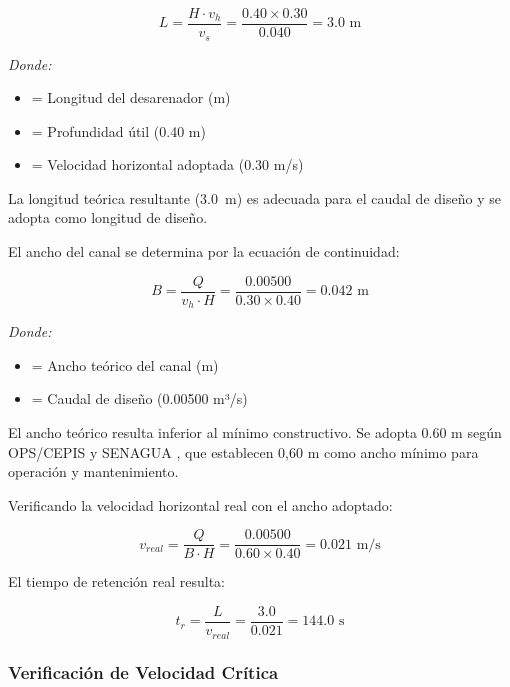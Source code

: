 \documentclass[12pt,a4paper]{article}
\begin{document}
\begin{equation}
L = \frac{H \cdot v_h}{v_s} = \frac{0.40 \times 0.30}{0.040} = 3.0 \text{ m}
\end{equation}

\textit{Donde:}
\begin{itemize}[noitemsep,leftmargin=2em]
    \item[$L$] = Longitud del desarenador (m)
    \item[$H$] = Profundidad útil (0.40 m)
    \item[$v_h$] = Velocidad horizontal adoptada (0.30 m/s)
\end{itemize}

La longitud teórica resultante (3.0~m) es adecuada para el caudal de diseño y se adopta como longitud de diseño.

El ancho del canal se determina por la ecuación de continuidad:

\begin{equation}
B = \frac{Q}{v_h \cdot H} = \frac{0.00500}{0.30 \times 0.40} = 0.042 \text{ m}
\end{equation}

\textit{Donde:}
\begin{itemize}[noitemsep,leftmargin=2em]
    \item[$B$] = Ancho teórico del canal (m)
    \item[$Q$] = Caudal de diseño (0.00500 m³/s)
\end{itemize}

El ancho teórico resulta inferior al mínimo constructivo. Se adopta 0.60 m según OPS/CEPIS \cite{ops2005} y SENAGUA \cite{senagua2012}, que establecen 0,60 m como ancho mínimo para operación y mantenimiento.

Verificando la velocidad horizontal real con el ancho adoptado:

\begin{equation}
v_{real} = \frac{Q}{B \cdot H} = \frac{0.00500}{0.60 \times 0.40} = 0.021 \text{ m/s}
\end{equation}

El tiempo de retención real resulta:

\begin{equation}
t_r = \frac{L}{v_{real}} = \frac{3.0}{0.021} = 144.0 \text{ s}
\end{equation}

\subsubsection{Verificación de Velocidad Crítica}
\end{document}

